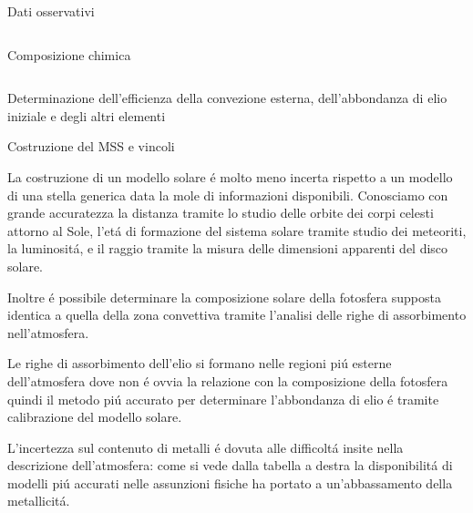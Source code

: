 \documentclass[10pt,xcolor={usenames},fleqn,mathserif,serif]{beamer}
\begin{document}
\begin{frame}{Dati osservativi}
\begin{columns}
\begin{column}{0.5\textwidth}
\begin{block}{Composizione chimica}
\end{block}

\end{column}

\end{columns}

\begin{block}{Determinazione dell'efficienza della convezione esterna, dell'abbondanza di elio iniziale e degli altri elementi}

\end{block}

\end{frame}

\begin{wordonframe}{Costruzione del MSS e vincoli}

La costruzione di un modello solare \'e molto meno incerta rispetto a un modello di una stella generica data la mole di informazioni disponibili. Conosciamo con grande accuratezza la distanza tramite lo studio delle orbite dei corpi celesti attorno al Sole, l'et\'a di formazione del sistema solare tramite studio dei meteoriti, la luminosit\'a, e il raggio tramite la misura delle dimensioni apparenti del disco solare.

Inoltre \'e possibile determinare la composizione solare della fotosfera supposta identica a quella della zona convettiva tramite l'analisi delle righe di assorbimento nell'atmosfera.

Le righe di assorbimento dell'elio si formano nelle regioni pi\'u esterne dell'atmosfera dove non \'e ovvia la relazione con la composizione della fotosfera quindi il metodo pi\'u accurato per determinare l'abbondanza di elio \'e tramite calibrazione del modello solare.

L'incertezza sul contenuto di metalli \'e dovuta alle difficolt\'a insite nella descrizione dell'atmosfera: come si vede dalla tabella a destra la disponibilit\'a di modelli pi\'u accurati nelle assunzioni fisiche ha portato a un'abbassamento della metallicit\'a. 

\end{wordonframe}
\end{document}
